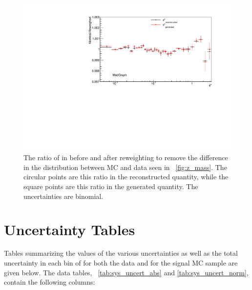 \begin{figure}[!htbp]
    \centering
    \includegraphics[width=\textwidth]{figures/ZMass_reweighed.pdf}
    \caption[
        The ratio of \phistar in \MADGRAPH before and after reweighting to
        remove the differnce in the \mee distribution between MC and data.
    ]{
        The ratio of \phistar in \MADGRAPH before and after reweighting to
        remove the difference in the \mee distribution between MC and data seen
        in \FIG~\ref{fig:z_mass}. The circular points are this ratio in the
        reconstructed quantity, while the square points are this ratio in the
        generated quantity. The uncertainties are binomial.
    }
    \label{fig:z_mass_reweighted}
\end{figure}

\section{Uncertainty Tables}

Tables summarizing the values of the various uncertainties as well as the total
uncertainty in each bin of \phistar for both the data and for the \MADGRAPH
signal MC sample are given below. The data tables,
\TABS~\ref{tab:sys_uncert_abs} and \ref{tab:sys_uncert_norm}, contain the
following columns:

